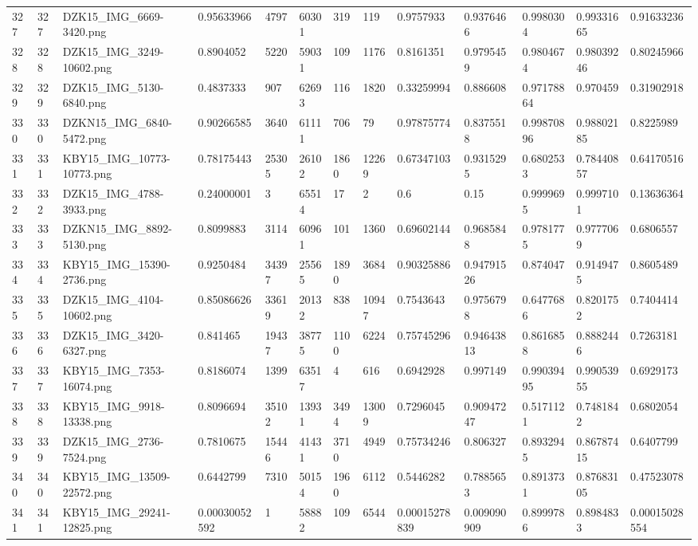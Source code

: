 \documentclass[11pt, a4paper, twoside]{report}
\begin{document}
\begin{longtable}[c]{@{}lllllllllllll@{}}
327 & 327 & DZK15\_IMG\_6669-3420.png & 0.95633966 & 4797 & 60301 & 319 & 119 & 0.9757933 & 0.9376466 & 0.9980304 & 0.99331665 & 0.91633236 \\
328 & 328 & DZK15\_IMG\_3249-10602.png & 0.8904052 & 5220 & 59031 & 109 & 1176 & 0.8161351 & 0.9795459 & 0.9804674 & 0.98039246 & 0.80245966 \\
329 & 329 & DZK15\_IMG\_5130-6840.png & 0.4837333 & 907 & 62693 & 116 & 1820 & 0.33259994 & 0.886608 & 0.97178864 & 0.970459 & 0.31902918 \\
330 & 330 & DZKN15\_IMG\_6840-5472.png & 0.90266585 & 3640 & 61111 & 706 & 79 & 0.97875774 & 0.8375518 & 0.99870896 & 0.98802185 & 0.8225989 \\
331 & 331 & KBY15\_IMG\_10773-10773.png & 0.78175443 & 25305 & 26102 & 1860 & 12269 & 0.67347103 & 0.9315295 & 0.6802533 & 0.78440857 & 0.64170516 \\
332 & 332 & DZK15\_IMG\_4788-3933.png & 0.24000001 & 3 & 65514 & 17 & 2 & 0.6 & 0.15 & 0.9999695 & 0.9997101 & 0.13636364 \\
333 & 333 & DZKN15\_IMG\_8892-5130.png & 0.8099883 & 3114 & 60961 & 101 & 1360 & 0.69602144 & 0.9685848 & 0.9781775 & 0.9777069 & 0.6806557 \\
334 & 334 & KBY15\_IMG\_15390-2736.png & 0.9250484 & 34397 & 25565 & 1890 & 3684 & 0.90325886 & 0.94791526 & 0.874047 & 0.9149475 & 0.8605489 \\
335 & 335 & DZK15\_IMG\_4104-10602.png & 0.85086626 & 33619 & 20132 & 838 & 10947 & 0.7543643 & 0.9756798 & 0.6477686 & 0.8201752 & 0.7404414 \\
336 & 336 & DZK15\_IMG\_3420-6327.png & 0.841465 & 19437 & 38775 & 1100 & 6224 & 0.75745296 & 0.94643813 & 0.8616858 & 0.8882446 & 0.7263181 \\
337 & 337 & KBY15\_IMG\_7353-16074.png & 0.8186074 & 1399 & 63517 & 4 & 616 & 0.6942928 & 0.997149 & 0.99039495 & 0.99053955 & 0.6929173 \\
338 & 338 & KBY15\_IMG\_9918-13338.png & 0.8096694 & 35102 & 13931 & 3494 & 13009 & 0.7296045 & 0.90947247 & 0.5171121 & 0.7481842 & 0.6802054 \\
339 & 339 & DZK15\_IMG\_2736-7524.png & 0.7810675 & 15446 & 41431 & 3710 & 4949 & 0.75734246 & 0.806327 & 0.8932945 & 0.86787415 & 0.6407799 \\
340 & 340 & KBY15\_IMG\_13509-22572.png & 0.6442799 & 7310 & 50154 & 1960 & 6112 & 0.5446282 & 0.7885653 & 0.8913731 & 0.87683105 & 0.47523078 \\
341 & 341 & KBY15\_IMG\_29241-12825.png & 0.00030052592 & 1 & 58882 & 109 & 6544 & 0.00015278839 & 0.009090909 & 0.8999786 & 0.8984833 & 0.00015028554 \\

\end{longtable}
\end{document}
